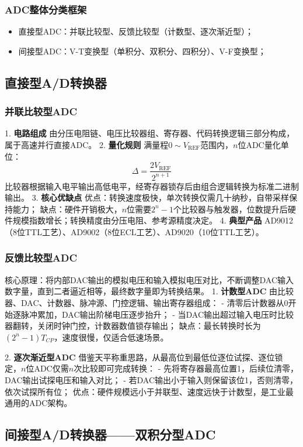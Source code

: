 \subsubsection{ADC整体分类框架}
\begin{itemize}
\item 直接型ADC：并联比较型、反馈比较型（计数型、逐次渐近型）；
\item 间接型ADC：V-T变换型（单积分、双积分、四积分）、V-F变换型；
\end{itemize}

\subsection{直接型A/D转换器}
\subsubsection{并联比较型ADC}
1. \textbf{电路组成}
由分压电阻链、电压比较器组、寄存器、代码转换逻辑三部分构成，属于高速并行直接ADC。
2. \textbf{量化规则}
满量程$0\sim V_\text{REF}$范围内，$n$位ADC量化单位：
\[
\Delta=\frac{2V_\text{REF}}{2^{n+1}}
\]
比较器根据输入电平输出高低电平，经寄存器锁存后由组合逻辑转换为标准二进制输出。
3. \textbf{核心优缺点}
优点：转换速度极快，单次转换仅需几十纳秒，自带采样保持能力；
缺点：硬件开销极大，$n$位需要$2^n-1$个比较器与触发器，位数提升后硬件规模指数增长；转换精度由分压电阻、参考源精度决定。
4. \textbf{典型产品}
AD9012（8位TTL工艺）、AD9002（8位ECL工艺）、AD9020（10位TTL工艺）。

\subsubsection{反馈比较型ADC}
核心原理：将内部DAC输出的模拟电压和输入模拟电压对比，不断调整DAC输入数字量，直到二者逼近相等，最终数字量即为转换结果。
1. \textbf{计数型ADC}
由比较器、DAC、计数器、脉冲源、门控逻辑、输出寄存器组成：
- 清零后计数器从0开始逐脉冲累加，DAC输出阶梯电压逐步抬升；
- 当DAC输出超过输入电压时比较器翻转，关闭时钟门控，计数器数值锁存输出；
缺点：最长转换时长为$(2^n-1)T_{CP}$，速度很慢，仅适合低速场景。

2. \textbf{逐次渐近型ADC}
借鉴天平称重思路，从最高位到最低位逐位试探、逐位锁定，$n$位ADC仅需$n$次比较即可完成转换：
- 先将寄存器最高位置1，后续位清零，DAC输出试探电压和输入对比；
- 若DAC输出小于输入则保留该位1，否则清零，依次试探所有位；
优点：硬件规模远小于并联型、速度远快于计数型，是工业最通用的ADC架构。

\subsection{间接型A/D转换器——双积分型ADC}
